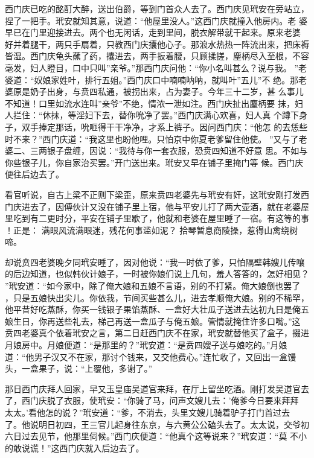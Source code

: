 西门庆已吃的酩酊大醉，送出伯爵，等到门首众人去了。西门庆见玳安在旁站立，
捏了一把手。玳安就知其意，说道：“他屋里没人。”这西门庆就撞入他房内。老
婆早已在门里迎接进去。两个也无闲话，走到里间，脱衣解带就干起来。原来老婆
好并着腿干，两只手扇着，只教西门庆攮他心子。那浪水热热一阵流出来，把床褥
皆湿。西门庆龟头蘸了药，攮进去，两手扳着腰，只顾揉搓，麈柄尽入至根，不容
毫发，妇人瞪目，口中只叫”亲爷。”那西门庆问他：“你小名叫甚么？说与我。
”老婆道：“奴娘家姓叶，排行五姐。”西门庆口中喃喃呐呐，就叫叶”五儿”不
绝。那老婆原是奶子出身，与贲四私通，被拐出来，占为妻子。今年三十二岁，甚
么事儿不知道！口里如流水连叫”亲爷”不绝，情浓一泄如注。西门庆扯出麈柄要
抹，妇人拦住：“休抹，等淫妇下去，替你吮净了罢。”西门庆满心欢喜，妇人真
个蹲下身子，双手捧定那话，吮咂得干干净净，才系上裤子。因问西门庆：“他怎
的去恁些时不来？”西门庆道：“我这里也盼他哩。只怕京中你夏老爹留住他使。
”又与了老婆二、三两银子盘缠，因说：“我待与你一套衣服，恐贲四知道不好意
思。不如与你些银子儿，你自家治买罢。”开门送出来。玳安又早在铺子里掩门等
候。西门庆便往后边去了。

看官听说，自古上梁不正则下梁歪，原来贲四老婆先与玳安有奸，这玳安刚打发西
门庆进去了，因傅伙计又没在铺子里上宿，他与平安儿打了两大壶酒，就在老婆屋
里吃到有二更时分，平安在铺子里歇了，他就和老婆在屋里睡了一宿。有这等的事
！正是：
满眼风流满眼迷，残花何事滥如泥？
拾琴暂息商陵操，惹得山禽绕树啼。

却说贲四老婆晚夕同玳安睡了，因对他说：“我一时依了爹，只怕隔壁韩嫂儿传嚷
的后边知道，也似韩伙计娘子，一时被你娘们说上几句，羞人答答的，怎好相见？
”玳安道：“如今家中，除了俺大娘和五娘不言语，别的不打紧。俺大娘倒也罢了
，只是五娘快出尖儿。你依我，节间买些甚么儿，进去孝顺俺大娘。别的不稀罕，
他平昔好吃蒸酥，你买一钱银子果馅蒸酥、一盒好大壮瓜子送进去达初九日是俺五
娘生日，你再送些礼去，梯己再送一盒瓜子与俺五娘。管情就掩住许多口嘴。”这
贲四老婆真个依着玳安之言，第二日赶西门庆不在家，玳安就替他买了盒子，掇进
月娘房中。月娘便道：“是那里的？”玳安道：“是贲四嫂子送与娘吃的。”月娘
道：“他男子汉又不在家，那讨个钱来，又交他费心。”连忙收了，又回出一盒馒
头，一盒果子，说：“上覆他，多谢了。”

那日西门庆拜人回家，早又玉皇庙吴道官来拜，在厅上留坐吃酒。刚打发吴道官去
了，西门庆脱了衣服，使玳安：“你骑了马，问声文嫂儿去：'俺爹今日要来拜拜
太太。'看他怎的说？”玳安道：“爹，不消去，头里文嫂儿骑着驴子打门首过去
了。他说明日初四，王三官儿起身往东京，与六黄公公磕头去了。太太说，交爷初
六日过去见节，他那里伺候。”西门庆便道：“他真个这等说来？”玳安道：“莫
不小的敢说谎！”这西门庆就入后边去了。

